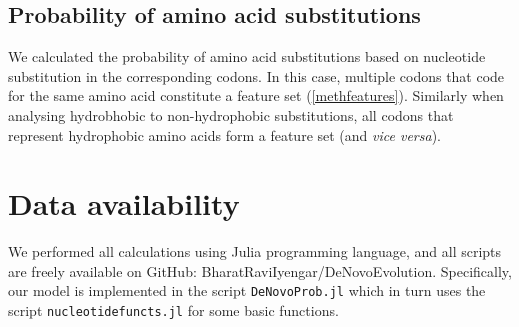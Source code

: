 \documentclass[12pt,a4paper]{article}
\begin{document}
\subsection{Probability of amino acid substitutions}

We calculated the probability of amino acid substitutions based on nucleotide substitution in the corresponding codons. In this case, multiple codons that code for the same amino acid constitute a feature set (\autoref{methfeatures}). Similarly when analysing hydrobhobic to non-hydrophobic substitutions, all codons that represent hydrophobic amino acids form a feature set (and \textit{vice versa}).

\section{Data availability}
We performed all calculations using Julia programming language, and all scripts are freely available on GitHub: BharatRaviIyengar/DeNovoEvolution. Specifically, our model is implemented in the script \texttt{DeNovoProb.jl} which in turn uses the script \texttt{nucleotidefuncts.jl} for some basic functions.



\small

\end{document}
